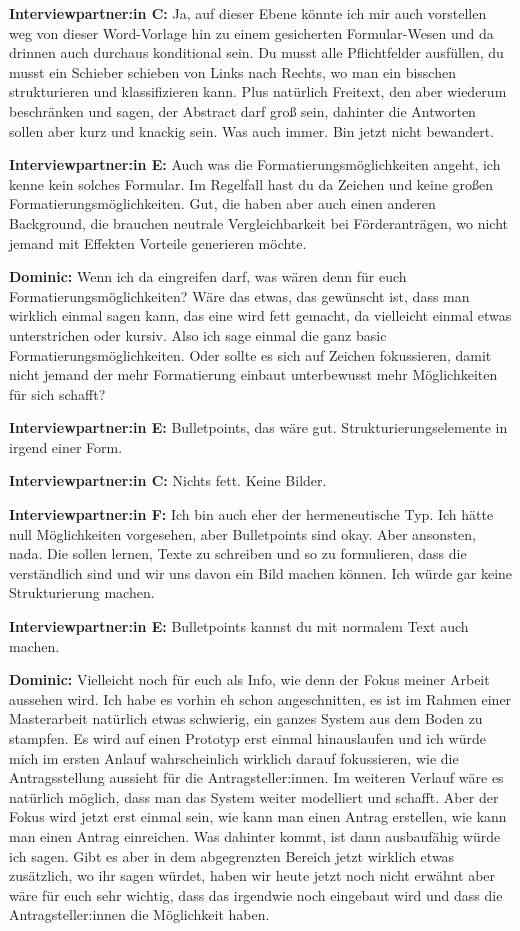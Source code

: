 \documentclass[a4paper,12pt,twoside]{scrreprt}
\begin{document}
\textbf{Interviewpartner:in C:} Ja, auf dieser Ebene könnte ich mir auch vorstellen weg von dieser Word-Vorlage hin zu einem gesicherten Formular-Wesen und da drinnen auch durchaus konditional sein. Du musst alle Pflichtfelder ausfüllen, du musst ein Schieber schieben von Links nach Rechts, wo man ein bisschen strukturieren und klassifizieren kann. Plus natürlich Freitext, den aber wiederum beschränken und sagen, der Abstract darf groß sein, dahinter die Antworten sollen aber kurz und knackig sein. Was auch immer. Bin jetzt nicht bewandert.

\textbf{Interviewpartner:in E:} Auch was die Formatierungsmöglichkeiten angeht, ich kenne kein solches Formular. Im Regelfall hast du da Zeichen und keine großen Formatierungsmöglichkeiten. Gut, die haben aber auch einen anderen Background, die brauchen neutrale Vergleichbarkeit bei Förderanträgen, wo nicht jemand mit Effekten Vorteile generieren möchte.

\textbf{Dominic:} Wenn ich da eingreifen darf, was wären denn für euch Formatierungsmöglichkeiten? Wäre das etwas, das gewünscht ist, dass man wirklich einmal sagen kann, das eine wird fett gemacht, da vielleicht einmal etwas unterstrichen oder kursiv. Also ich sage einmal die ganz basic Formatierungsmöglichkeiten. Oder sollte es sich auf Zeichen fokussieren, damit nicht jemand der mehr Formatierung einbaut unterbewusst mehr Möglichkeiten für sich schafft?

\textbf{Interviewpartner:in E:} Bulletpoints, das wäre gut. Strukturierungselemente in irgend einer Form.

\textbf{Interviewpartner:in C:} Nichts fett. Keine Bilder.

\textbf{Interviewpartner:in F:} Ich bin auch eher der hermeneutische Typ. Ich hätte null Möglichkeiten vorgesehen, aber Bulletpoints sind okay. Aber ansonsten, nada. Die sollen lernen, Texte zu schreiben und so zu formulieren, dass die verständlich sind und wir uns davon ein Bild machen können. Ich würde gar keine Strukturierung machen.

\textbf{Interviewpartner:in E:} Bulletpoints kannst du mit normalem Text auch machen.

\textbf{Dominic:} Vielleicht noch für euch als Info, wie denn der Fokus meiner Arbeit aussehen wird. Ich habe es vorhin eh schon angeschnitten, es ist im Rahmen einer Masterarbeit natürlich etwas schwierig, ein ganzes System aus dem Boden zu stampfen. Es wird auf einen Prototyp erst einmal hinauslaufen und ich würde mich im ersten Anlauf wahrscheinlich wirklich darauf fokussieren, wie die Antragsstellung aussieht für die Antragsteller:innen. Im weiteren Verlauf wäre es natürlich möglich, dass man das System weiter modelliert und schafft. Aber der Fokus wird jetzt erst einmal sein, wie kann man einen Antrag erstellen, wie kann man einen Antrag einreichen. Was dahinter kommt, ist dann ausbaufähig würde ich sagen. Gibt es aber in dem abgegrenzten Bereich jetzt wirklich etwas zusätzlich, wo ihr sagen würdet, haben wir heute jetzt noch nicht erwähnt aber wäre für euch sehr wichtig, dass das irgendwie noch eingebaut wird und dass die Antragsteller:innen die Möglichkeit haben.
\end{document}

